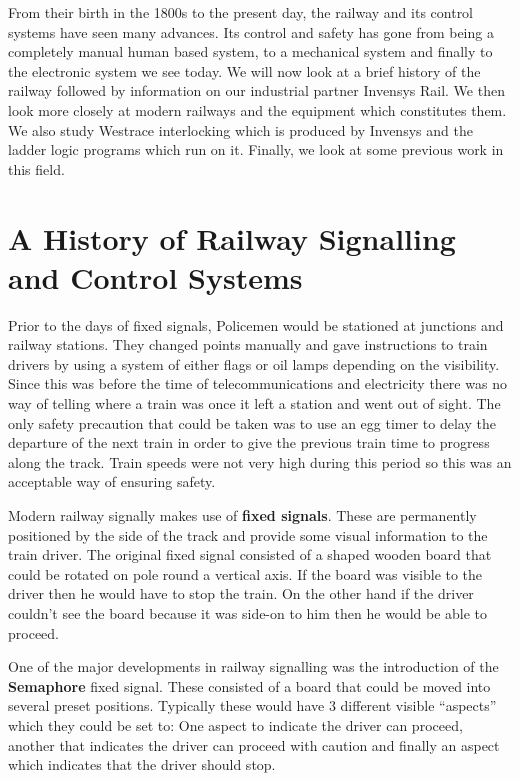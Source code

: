 From their birth in the 1800s to the present day, the railway and its control
systems have seen many advances. Its control and safety has gone from being a
completely manual human based system, to a mechanical system and finally to the electronic
system we see today. We will now look at a brief history of the railway
followed by information on our industrial partner Invensys Rail. We then look
more closely at modern railways and the equipment which constitutes
them. We also study
Westrace interlocking which is produced by Invensys and the
ladder logic programs which run on it. Finally, we look at some previous work
in this field.


\section{ A History of Railway Signalling and Control Systems}
Prior to the days of fixed signals, Policemen would be stationed at
junctions and railway stations. They changed points manually and gave instructions to train drivers
by using a system of either flags or oil lamps depending on the
visibility. Since this was before the time of telecommunications and
electricity there was no way of telling where a train was once it left a
station and went out of sight. The only safety precaution that could be taken
was to use an egg timer to delay the departure of the next train in order to
give the previous train time to progress along the track. Train speeds were
not very high during this period so this was an acceptable way of ensuring safety.

Modern railway signally makes use of \textbf{fixed signals}. These are permanently positioned
by the side of the track and provide some visual information to the train driver.
The original fixed signal consisted of a shaped wooden board that could be
rotated on pole round a vertical axis. If the board was visible to the driver
then he would have to stop the train. On the other hand if the driver couldn't
see the board because it was side-on to him then he would be able to
proceed.

One of the major developments in railway signalling was the introduction of
the \textbf{Semaphore} fixed signal. These consisted of a board that could be
moved into several preset positions. Typically these would have  3 different visible
``aspects'' which they could be set to: One aspect to indicate the driver can
proceed, another that indicates the driver can proceed with caution and
finally an aspect which indicates that the driver should stop. 

